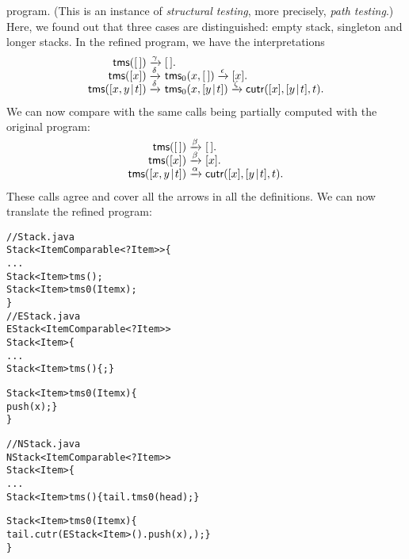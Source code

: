 program. (This is an instance of \emph{structural
  testing}, more precisely,
\emph{path testing}.) Here, we found out
that three cases are distinguished: empty stack, singleton and longer
stacks. In the refined program, we have the interpretations
\begin{equation*}
\begin{array}{@{}r@{\;}l@{\;}l@{}}
\fun{tms}(\el) & \xrightarrow{\smash{\gamma}} & \el.\\
\fun{tms}([x]) & \xrightarrow{\smash{\delta}} & \fun{tms}_0(x,\el)
                 \xrightarrow{\smash{\epsilon}} [x].\\
\fun{tms}(\cons{x,y}{t})
  & \xrightarrow{\smash{\delta}} & \fun{tms}_0(x,\cons{y}{t})
    \xrightarrow{\smash{\zeta}} \fun{cutr}([x],\cons{y}{t},t).
\end{array}
\end{equation*}
We can now compare with the same calls being partially computed with
the original program:
\begin{equation*}
\begin{array}{@{}r@{\;}l@{\;}l@{}}
\fun{tms}(\el) & \xrightarrow{\smash{\beta}} & \el.\\
\fun{tms}([x]) & \xrightarrow{\smash{\beta}} & [x].\\
\fun{tms}(\cons{x,y}{t}) & \xrightarrow{\smash{\alpha}}
                         & \fun{cutr}([x],\cons{y}{t},t).
\end{array}
\end{equation*}
These calls agree and cover all the arrows in all the definitions. We
can now translate the refined program:
\begin{alltt}
// Stack.java
\public \abstractX
\class Stack<Item \extends Comparable<? \super Item>> \{
  ...
  \public \abstractX Stack<Item> tms();
  \protectedX \abstractX Stack<Item> tms0(\final Item x);
\}
// EStack.java
\public \class EStack<Item \extends Comparable<? \super Item>>
       \extends Stack<Item> \{
  ...
  \public Stack<Item> tms() \{ \return \this; \}

  \protectedX Stack<Item> tms0(\final Item x) \{
    \return push(x); \}
\}

// NStack.java
\public \class NStack<Item \extends Comparable<? \super Item>>
       \extends Stack<Item> \{
  ...
  \public Stack<Item> tms() \{ \return tail.tms0(head); \}

  \protectedX Stack<Item> tms0(\final Item x) \{
    \return tail.cutr(\new EStack<Item>().push(x),\this); \}
\}
\end{alltt}
